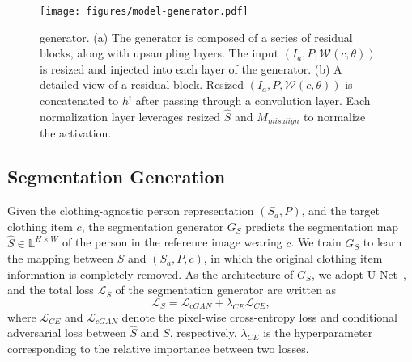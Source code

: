 \begin{figure*}[t!]
    \centering
    \texttt{[image: figures/model-generator.pdf]}
    \vspace{-0.5cm}
    \caption{\norm generator.
    (a) The \norm generator is composed of a series of \norm residual blocks, along with upsampling layers.
    The input $(I_a, P, \mathcal{W}(c, \theta))$ is resized and injected into each layer of the generator.
    (b) A detailed view of a \norm residual block.
    Resized $(I_a, P, \mathcal{W}(c,\theta))$ is concatenated to $h^{i}$ after passing through a convolution layer.
    Each \norm normalization layer leverages resized $\hat{S}$ and $M_{misalign}$ to normalize the activation.
    }
    \vspace{-0.4cm}
    \label{fig:try-on synthesis}
\end{figure*}

\subsection{Segmentation Generation}\label{sec:segmentation}
Given the clothing-agnostic person representation $(S_a, P)$, and the target clothing item $c$, the segmentation generator $G_S$ predicts the segmentation map $\hat{S} \in \mathbb{L}^{H \times W}$ of the person in the reference image wearing $c$.
We train $G_S$ to learn the mapping between $S$ and $(S_a, P, c)$, in which the original clothing item information is completely removed.
As the architecture of $G_S$, we adopt U-Net~\cite{ronneberger2015u}, and the total loss $\mathcal{L}_S$ of the segmentation generator are written as 
\begin{equation}
    \mathcal{L}_{S} = \mathcal{L}_{cGAN} + \lambda_{CE} \mathcal{L}_{CE},
    \label{eq:segloss}
\end{equation}
where $\mathcal{L}_{CE}$ and $\mathcal{L}_{cGAN}$ denote the pixel-wise cross-entropy loss and conditional adversarial loss between $\hat{S}$ and $S$, respectively. $\lambda_{CE}$ is the hyperparameter corresponding to the relative importance between two losses.

